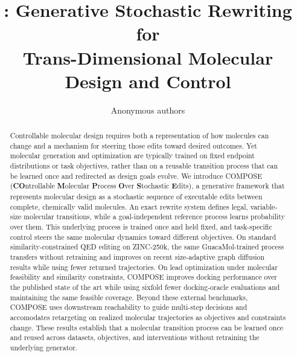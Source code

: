 \documentclass{article}
\title{\fontsize{15.9}{18.8}\selectfont \method: Generative Stochastic Rewriting for\\ Trans-Dimensional Molecular Design and Control}
\author{Anonymous authors}
\theoremstyle{definition}
\theoremstyle{remark}
\begin{document}
\maketitle

\newcommand{\TFourWins}{19}
\newcommand{\TFourLosses}{6}
\newcommand{\TFourTies}{1}
\newcommand{\TFourNoisy}{13}
\newcommand{\TFourDashWins}{3}
\newcommand{\TFourCoverage}{26}
\newcommand{\TFourNone}{4}
\newcommand{\TFourHeadWins}{16}
\newcommand{\TFourHeadN}{22}
\newcommand{\TFourPairedN}{23}
\newcommand{\TFourClusterLo}{-0.681}
\newcommand{\TFourClusterHi}{+0.014}
\newcommand{\TFourClusterN}{13}
\newcommand{\TFourMeanDiff}{-0.335}
\newcommand{\TFourCILo}{-0.651}
\newcommand{\TFourCIHi}{-0.019}

\begin{abstract}
Controllable molecular design requires both a representation of how molecules can change and a mechanism for steering those edits toward desired outcomes. Yet molecular generation and optimization are typically trained on fixed endpoint distributions or task objectives, rather than on a reusable transition process that can be learned once and redirected as design goals evolve. We introduce COMPOSE (\textbf{CO}ntrollable \textbf{M}olecular \textbf{P}rocess \textbf{O}ver \textbf{S}tochastic \textbf{E}dits), a generative framework that represents molecular design as a stochastic sequence of executable edits between complete, chemically valid molecules. An exact rewrite system defines legal, variable-size molecular transitions, while a goal-independent reference process learns probability over them. This underlying process is trained once and held fixed, and task-specific control steers the same molecular dynamics toward different objectives. On standard similarity-constrained QED editing on ZINC-250k, the same GuacaMol-trained process transfers without retraining and improves on recent size-adaptive graph diffusion results while using fewer returned trajectories. On lead optimization under molecular feasibility and similarity constraints, COMPOSE improves  docking performance over the published state of the art while using sixfold fewer docking-oracle evaluations and maintaining the same feasible coverage. Beyond these external benchmarks, COMPOSE uses downstream reachability to guide multi-step decisions and accomodates retargeting on realized molecular trajectories as objectives and constraints change. These results establish that a molecular transition process can be learned once and reused across datasets, objectives, and interventions without retraining the underlying generator.
\end{abstract}
\end{document}
